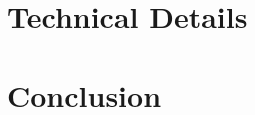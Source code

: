 \documentclass[11pt]{article}
\begin{document}
    \section{Technical Details}\label{sec:technical-details}
    

    \section{Conclusion}\label{sec:conclusion}
    
\end{document}
